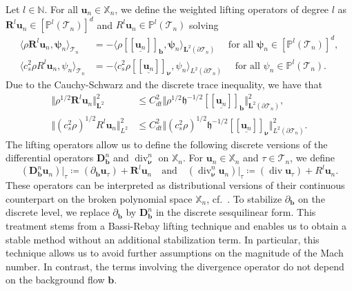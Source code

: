 \documentclass{m2an}
\newcommand{\csr}{c_s^2 \rho}
\newcommand{\nv}{\boldsymbol{\nu}}
\newcommand{\bflow}{\mathbf{b}}
\renewcommand{\u}{\mathbf{u}}
\renewcommand{\div}{\operatorname{div}}
\newcommand{\calT}{\mathcal{T}}
\newcommand{\Xn}{\mathbb{X}_n}
\newcommand{\bD}{\mathbf{D}}
\newcommand{\bRl}{\mathbf{R}^{\!l}}
\newcommand{\bL}{\mathbf{L}}
\newcommand{\bu}{\mathbf{u}}
\newcommand{\hdgjump}[1]{[\![\underline{#1} ]\!]}
\newcommand{\Tn}{\calT_n}
\newcommand{\N}{\mathbb{N}}
\newcommand{\spl}{\langle}
\newcommand{\spr}{\rangle}
\newcommand{\diffb}{\partial_{\bflow}}
\newcommand{\ddiffb}{\bD_{\bflow}^n}
\newcommand{\ddiv}{\div_{\nv}^n}
\newcommand{\h}{\mathfrak{h}}
\theoremstyle{plain}
\theoremstyle{definition}
\begin{document}
Let $l \in \N$. For all $\u_n \in \Xn$, we define the weighted lifting operators of degree $l$ as $\bRl \u_n \in [\mathbb{P}^l(\Tn)]^d$ and $R^l \u_n \in \mathbb{P}^l(\Tn)$ solving
\begin{subequations}
   \begin{align}
      \spl \rho \bRl \u_n, \bm{\psi}_n \spr_{\Tn} &= - \spl \rho \hdgjump{\u_n}_{\bflow}, \bm{\psi}_n \spr_{\bL^2(\partial \Tn)} \quad \text{ for all } \bm{\psi}_n \in [\mathbb{P}^l(\Tn)]^d, \label{eq:VecLift} \\
      \spl \csr R^l \u_n, \psi_n \spr_{\Tn} &= - \spl \csr \hdgjump{\u_n}_{\nv}, \psi_n \spr_{L^2(\partial \Tn)} \quad \text{ for all } \psi_n \in \mathbb{P}^l(\Tn). \label{eq:ScalLift}
   \end{align}
\end{subequations}
Due to the Cauchy-Schwarz and the discrete trace inequality, we have that
\begin{equation}\label{eq:liftingBoundedness}
   \begin{aligned}
      \Vert \rho^{1/2} \bRl\u_n \Vert_{\bL^2}^2 &\le C_{dt}^2 \Vert \rho^{1/2} \h^{-1/2} \hdgjump{\u_n}_{\bflow} \Vert^2_{\bL^2(\partial \Tn)},\\
      \Vert (\csr)^{1/2} R^l\u_n \Vert^2_{L^2} &\le C_{dt}^2  \Vert (\csr)^{1/2} \h^{-1/2} \hdgjump{\u_n}_{\nv}\Vert^2_{L^2(\partial \Tn)}.
   \end{aligned}
\end{equation}
The lifting operators allow us to define the following discrete versions of the differential operators $\ddiffb$ and $\ddiv$ on $\Xn$. For $\bu_n\in\Xn$ and $\tau \in \Tn$, we define
\begin{equation}\label{eq:discreteDiffs}
   (\ddiffb \u_n) \vert_{\tau} \coloneqq (\diffb \u_\tau)  + \bRl \u_n \quad \text{and} \quad (\ddiv \u_n) \vert_{\tau} \coloneqq (\div \u_{\tau})  + R^l\u_n. 
\end{equation}
These operators can be interpreted as distributional versions of their continuous counterpart on the broken polynomial space $\Xn$, cf.~\cite{BO09}. To stabilize $\diffb$ on the discrete level, we replace $\diffb$ by $\ddiffb$ in the discrete sesquilinear form. This treatment stems from a Bassi-Rebay lifting technique \cite{BR97,BMMPR00} and enables us to obtain a stable method without an additional stabilization term. In particular, this technique allows us to avoid further assumptions on the magnitude of the Mach number. In contrast, the terms involving the divergence operator do not depend on the background flow $\bflow$. 
\end{document}
